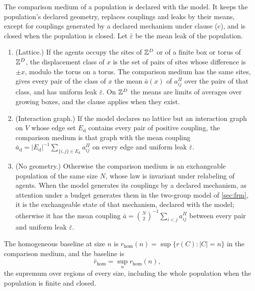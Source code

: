 \begin{definition}\label{def:col-baseline}
The comparison medium of a population is declared with the model. It keeps the population's declared geometry, replaces couplings and leaks by their means, except for couplings generated by a declared mechanism under clause (c), and is closed when the population is closed. Let $\bar\varepsilon$ be the mean leak of the population.
\begin{enumerate}
\item[(a)] (Lattice.) If the agents occupy the sites of $\mathbb{Z}^D$ or of a finite box or torus of $\mathbb{Z}^D$, the displacement class of $x$ is the set of pairs of sites whose difference is $\pm x$, modulo the torus on a torus. The comparison medium has the same sites, gives every pair of the class of $x$ the mean $\bar a(x)$ of $a^\Pi_{ij}$ over the pairs of that class, and has uniform leak $\bar\varepsilon$. On $\mathbb{Z}^D$ the means are limits of averages over growing boxes, and the clause applies when they exist.
\item[(b)] (Interaction graph.) If the model declares no lattice but an interaction graph on $V$ whose edge set $E_{\mathrm d}$ contains every pair of positive coupling, the comparison medium is that graph with the mean coupling $\bar a_{\mathrm d}=|E_{\mathrm d}|^{-1}\sum_{\{i,j\}\in E_{\mathrm d}}a^\Pi_{ij}$ on every edge and uniform leak $\bar\varepsilon$.
\item[(c)] (No geometry.) Otherwise the comparison medium is an exchangeable population of the same size $N$, whose law is invariant under relabeling of agents. When the model generates its couplings by a declared mechanism, as attention under a budget generates them in the two-group model of \cref{sec:frm}, it is the exchangeable state of that mechanism, declared with the model; otherwise it has the mean coupling $\bar a=\binom N2^{-1}\sum_{i<j}a^\Pi_{ij}$ between every pair and uniform leak $\bar\varepsilon$.
\end{enumerate}
The homogeneous baseline at size $n$ is $r_{\mathrm{hom}}(n)=\sup\{r(C):|C|=n\}$ in the comparison medium, and the baseline is
\begin{equation}\label{eq:col-baseline}
\bar r_{\mathrm{hom}}=\sup_nr_{\mathrm{hom}}(n),
\end{equation}
the supremum over regions of every size, including the whole population when the population is finite and closed.
\end{definition}

